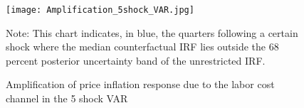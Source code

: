 \documentclass[11pt]{article}
\begin{document}
\begin{appendices}
\begin{figure}[!h]
\begin{center}
\caption{Amplification of price inflation response due to the labor cost channel in the 5 shock VAR}\label{fig:5ShockVAR_Counterfactual}
\texttt{[image: Amplification\_5shock\_VAR.jpg]}
\begin{minipage}{\textwidth} {\footnotesize
 Note: This chart indicates, in blue, the quarters following a certain shock where the median counterfactual IRF lies outside the 68 percent posterior uncertainty band of the unrestricted IRF. \par}
 \end{minipage}
\end{center}
\end{figure}

\clearpage


\end{appendices}




\end{document}
